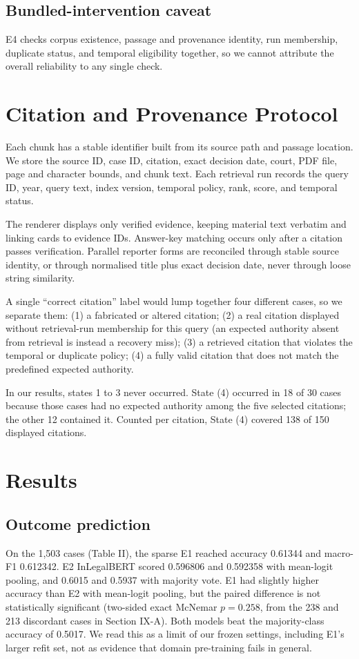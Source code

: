 \documentclass[conference]{IEEEtran}
\begin{document}
\subsection{Bundled-intervention caveat}
E4 checks corpus existence, passage and provenance identity, run membership, duplicate status, and temporal eligibility together, so we cannot attribute the overall reliability to any single check.

\section{Citation and Provenance Protocol}
Each chunk has a stable identifier built from its source path and passage location. We store the source ID, case ID, citation, exact decision date, court, PDF file, page and character bounds, and chunk text. Each retrieval run records the query ID, year, query text, index version, temporal policy, rank, score, and temporal status.

The renderer displays only verified evidence, keeping material text verbatim and linking cards to evidence IDs. Answer-key matching occurs only after a citation passes verification. Parallel reporter forms are reconciled through stable source identity, or through normalised title plus exact decision date, never through loose string similarity.

A single ``correct citation'' label would lump together four different cases, so we separate them: (1) a fabricated or altered citation; (2) a real citation displayed without retrieval-run membership for this query (an expected authority absent from retrieval is instead a recovery miss); (3) a retrieved citation that violates the temporal or duplicate policy; (4) a fully valid citation that does not match the predefined expected authority.

In our results, states 1 to 3 never occurred. State (4) occurred in 18 of 30 cases because those cases had no expected authority among the five selected citations; the other 12 contained it. Counted per citation, State (4) covered 138 of 150 displayed citations.

\section{Results}
\subsection{Outcome prediction}
On the 1,503 cases (Table II), the sparse E1 reached accuracy 0.61344 and macro-F1 0.612342. E2 InLegalBERT scored 0.596806 and 0.592358 with mean-logit pooling, and 0.6015 and 0.5937 with majority vote. E1 had slightly higher accuracy than E2 with mean-logit pooling, but the paired difference is not statistically significant (two-sided exact McNemar $p = 0.258$, from the 238 and 213 discordant cases in Section IX-A). Both models beat the majority-class accuracy of 0.5017. We read this as a limit of our frozen settings, including E1's larger refit set, not as evidence that domain pre-training fails in general.
\end{document}
